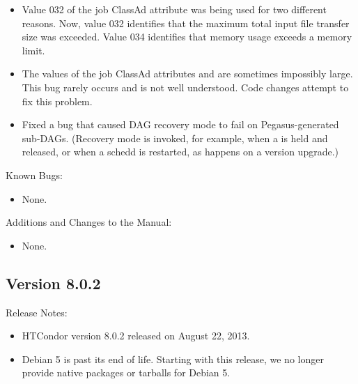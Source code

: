 \begin{itemize}
\item Value 032 of the job ClassAd attribute 
was being used for two different reasons.
Now, value 032 identifies that the maximum total input file 
transfer size was exceeded. 
Value 034 identifies that memory usage exceeds a memory limit.

\item The values of the job ClassAd attributes  
and  are sometimes impossibly large.
This bug rarely occurs and is not well understood.
Code changes attempt to fix this problem.

\item Fixed a bug that caused DAG recovery mode to fail on
Pegasus-generated sub-DAGs.  (Recovery mode is invoked, for example,
when a  is held and released, or when a schedd is
restarted, as happens on a version upgrade.)

\end{itemize}

\noindent Known Bugs:

\begin{itemize}

\item None.

\end{itemize}

\noindent Additions and Changes to the Manual:

\begin{itemize}

\item None.

\end{itemize}


\subsection*{\label{sec:New-8-0-2}Version 8.0.2}

\noindent Release Notes:

\begin{itemize}

\item HTCondor version 8.0.2 released on August 22, 2013.

\item Debian 5 is past its end of life. 
Starting with this release, we no longer provide native packages or
tarballs for Debian 5.

\end{itemize}


